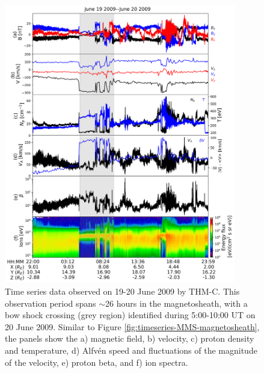 \begin{figure}
    \centering
    \includegraphics[width=0.9\textwidth]{Figures/Time series/timeseries_19062009_THMC.png}
    \caption[Time series data observed in the magnetosheath during 19-20 June 2009]{Time series data observed on 19-20 June 2009 by THM-C. This observation period spans $\sim$26 hours in the magnetosheath, with a bow shock crossing (grey region) identified during 5:00-10:00 UT on 20 June 2009. Similar to Figure \ref{fig:timeseries-MMS-magnetosheath}, the panels show the a) magnetic field, b) velocity, c) proton density and temperature, d) Alfv\'en speed and fluctuations of the magnitude of the velocity, e) proton beta, and f) ion spectra.}
    \label{fig:timeseries-THM-magnetosheath}
\end{figure}

